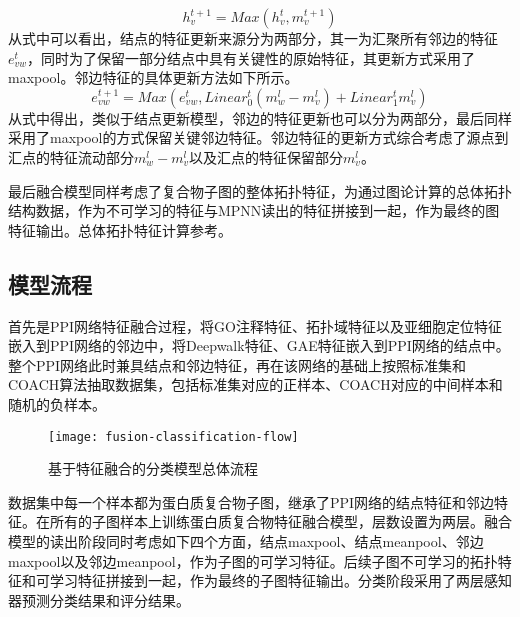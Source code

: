 \begin{equation}
    \label{equ:MineMPNNReadout}
    h_v^{t+1} = Max(h_v^t,m_v^{t+1})
\end{equation}
从式中可以看出，结点的特征更新来源分为两部分，其一为汇聚所有邻边的特征$e_{vw}^t$，同时为了保留一部分结点中具有关键性的原始特征，其更新方式采用了maxpool。邻边特征的具体更新方法如下所示。
\begin{equation}
    \label{equ:MineMPNNedge}
    e_{vw}^{t+1} = Max(e_{vw}^t,Linear_0^t(m_w^{l} - m_v^{l}) + Linear_1^t m_v^{l})
\end{equation}
从式中得出，类似于结点更新模型，邻边的特征更新也可以分为两部分，最后同样采用了maxpool的方式保留关键邻边特征。邻边特征的更新方式综合考虑了源点到汇点的特征流动部分$m_w^{l} - m_v^{l}$以及汇点的特征保留部分$m_v^{l}$。


最后融合模型同样考虑了复合物子图的整体拓扑特征，为通过图论计算的总体拓扑结构数据，作为不可学习的特征与MPNN读出的特征拼接到一起，作为最终的图特征输出。总体拓扑特征计算参考\cite{yu_predicting_2014}。

\subsection{模型流程}
\label{subsection:fusion:Modelflow}
首先是PPI网络特征融合过程，将GO注释特征、拓扑域特征以及亚细胞定位特征嵌入到PPI网络的邻边中，将Deepwalk特征、GAE特征嵌入到PPI网络的结点中。整个PPI网络此时兼具结点和邻边特征，再在该网络的基础上按照标准集和COACH算法抽取数据集，包括标准集对应的正样本、COACH对应的中间样本和随机的负样本。
\begin{figure}[htbp]
    \centering
    \texttt{[image: fusion-classification-flow]}
    \caption{基于特征融合的分类模型总体流程}
    \label{fig:fusion-classification-flow}
\end{figure}

数据集中每一个样本都为蛋白质复合物子图，继承了PPI网络的结点特征和邻边特征。在所有的子图样本上训练蛋白质复合物特征融合模型，层数设置为两层。融合模型的读出阶段同时考虑如下四个方面，结点maxpool、结点meanpool、邻边maxpool以及邻边meanpool，作为子图的可学习特征。后续子图不可学习的拓扑特征和可学习特征拼接到一起，作为最终的子图特征输出。分类阶段采用了两层感知器预测分类结果和评分结果。


